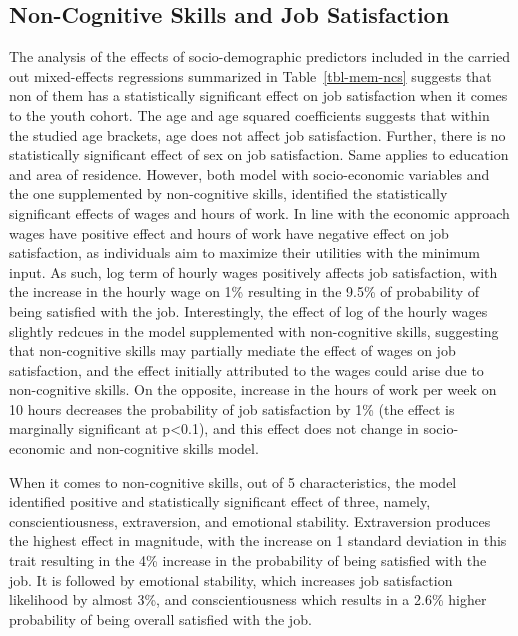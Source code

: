 \documentclass[
]{interact}
\begin{document}
\subsection{Non-Cognitive Skills and Job
Satisfaction}\label{non-cognitive-skills-and-job-satisfaction}

The analysis of the effects of socio-demographic predictors included in
the carried out mixed-effects regressions summarized in
Table~\ref{tbl-mem-ncs} suggests that non of them has a statistically
significant effect on job satisfaction when it comes to the youth
cohort. The age and age squared coefficients suggests that within the
studied age brackets, age does not affect job satisfaction. Further,
there is no statistically significant effect of sex on job satisfaction.
Same applies to education and area of residence. However, both model
with socio-economic variables and the one supplemented by non-cognitive
skills, identified the statistically significant effects of wages and
hours of work. In line with the economic approach wages have positive
effect and hours of work have negative effect on job satisfaction, as
individuals aim to maximize their utilities with the minimum input. As
such, log term of hourly wages positively affects job satisfaction, with
the increase in the hourly wage on 1\% resulting in the 9.5\% of
probability of being satisfied with the job. Interestingly, the effect
of log of the hourly wages slightly redcues in the model supplemented
with non-cognitive skills, suggesting that non-cognitive skills may
partially mediate the effect of wages on job satisfaction, and the
effect initially attributed to the wages could arise due to
non-cognitive skills. On the opposite, increase in the hours of work per
week on 10 hours decreases the probability of job satisfaction by 1\%
(the effect is marginally significant at p\textless0.1), and this effect
does not change in socio-economic and non-cognitive skills model.

When it comes to non-cognitive skills, out of 5 characteristics, the
model identified positive and statistically significant effect of three,
namely, conscientiousness, extraversion, and emotional stability.
Extraversion produces the highest effect in magnitude, with the increase
on 1 standard deviation in this trait resulting in the 4\% increase in
the probability of being satisfied with the job. It is followed by
emotional stability, which increases job satisfaction likelihood by
almost 3\%, and conscientiousness which results in a 2.6\% higher
probability of being overall satisfied with the job.
\end{document}
